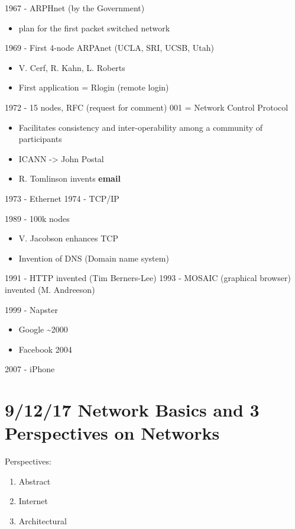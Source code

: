 \documentclass[11pt]{article}
\begin{document}
1967 - ARPHnet (by the Government)
\begin{itemize}
\item plan for the first packet switched network
\end{itemize}

1969 - First 4-node ARPAnet (UCLA, SRI, UCSB, Utah)
\begin{itemize}
\item V. Cerf, R. Kahn, L. Roberts
\item First application = Rlogin (remote login)
\end{itemize}

1972 - 15 nodes, RFC (request for comment) 001 = Network Control Protocol
\begin{itemize}
\item Facilitates consistency and inter-operability among a community of participants
\item ICANN -> John Postal
\item R. Tomlinson invents \textbf{email}
\end{itemize}

1973 - Ethernet
1974 - TCP/IP

1989 - 100k nodes
\begin{itemize}
\item V. Jacobson enhances TCP
\item Invention of DNS (Domain name system)
\end{itemize}

1991 - HTTP invented (Tim Berners-Lee)
1993 - MOSAIC (graphical browser) invented (M. Andreeson)

1999 - Napster
\begin{itemize}
\item Google \textasciitilde{}2000
\item Facebook 2004
\end{itemize}

2007 - iPhone

\section{9/12/17  Network Basics and 3 Perspectives on Networks}
\label{sec:orgheadline6}
Perspectives:
\begin{enumerate}
\item Abstract
\item Internet
\item Architectural
\end{enumerate}
\end{document}
